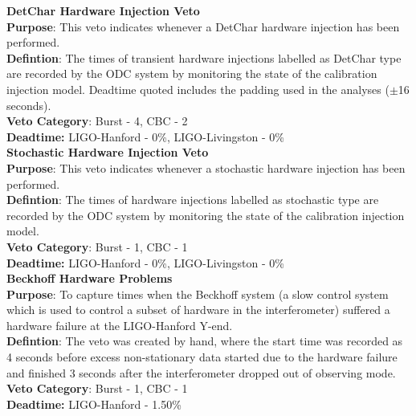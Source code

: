 \textbf{DetChar Hardware Injection Veto} \\
\textbf{Purpose}: This veto indicates whenever a DetChar hardware injection has
been performed.\\
\textbf{Defintion}: The times of transient hardware injections labelled as
DetChar type are recorded by the ODC system by monitoring the state of the
calibration injection model. Deadtime quoted includes the padding used in the
analyses ($\pm$16 seconds).\\
\textbf{Veto Category}: Burst - 4, CBC - 2\\
\textbf{Deadtime:} LIGO-Hanford - 0\%, LIGO-Livingston - 0\%
\\

\textbf{Stochastic Hardware Injection Veto} \\
\textbf{Purpose}: This veto indicates whenever a stochastic hardware injection
has been performed.\\
\textbf{Defintion}: The times of hardware injections labelled as
stochastic type are recorded by the ODC system by monitoring the state of the
calibration injection model.\\
\textbf{Veto Category}: Burst - 1, CBC - 1\\
\textbf{Deadtime:} LIGO-Hanford - 0\%, LIGO-Livingston - 0\%
\\

\textbf{Beckhoff Hardware Problems} \\
\textbf{Purpose}: To capture times when the Beckhoff system (a slow control
system which is used to control a subset of hardware in the interferometer)
suffered a hardware failure at the LIGO-Hanford Y-end. \\
\textbf{Defintion}: The veto was created by hand, where the start time was
recorded as 4 seconds before excess non-stationary data started due to the
hardware failure and finished 3 seconds after the interferometer dropped out of
observing mode.\\
\textbf{Veto Category}: Burst - 1, CBC - 1\\
\textbf{Deadtime:} LIGO-Hanford - 1.50\%
\\

